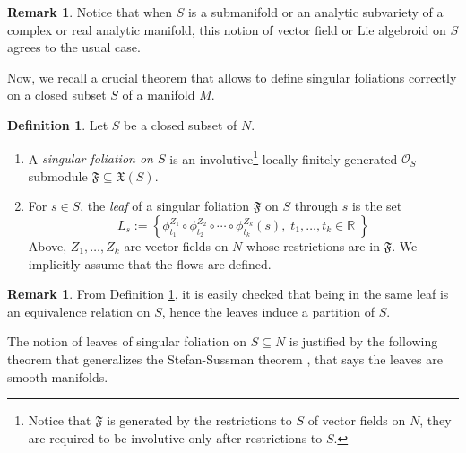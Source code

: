 \documentclass[10pt]{article}
\theoremstyle{plain}
\theoremstyle{definition}
\newtheorem{definition}[lemma]{Definition}
\newtheorem{remark}[lemma]{Remark}
\theoremstyle{remark}
\begin{document}
\begin{remark}
    Notice that when $S$ is a  submanifold or an analytic subvariety of a complex or real analytic manifold,  this notion of vector field or Lie algebroid on $S$ agrees to the usual case.
\end{remark}



Now,  we recall a crucial theorem that allows to define singular foliations correctly on a closed subset $S$ of a manifold $M$.

\begin{definition}\cite{LLL, LLS}\label{def:leaves}\label{def:SF2} Let $S$ be a closed subset of $N$.
\begin{enumerate}
    \item  A \emph{singular foliation on $S$} is an involutive\footnote{Notice that $\mathfrak{F}$ is generated by the restrictions to $S$ of vector fields on $N$, they are  required to be involutive only after restrictions to $S$.} locally finitely generated $\mathcal{O}_S$-submodule $\mathfrak{F}\subseteq\mathfrak X(S)$.
    \item For $s\in S$, the \emph{leaf} of a singular foliation $\mathfrak{F}$ on $S$ through $s$ is the set 
\begin{equation}
        L_s:=\left\{\phi_{t_1}^{Z_1}\circ \phi_{t_2}^{Z_2}\circ \cdots \circ \phi_{t_k}^{Z_k}(s),\; t_1, \ldots, t_k\in \mathbb R\; \right\}
    \end{equation}
 Above, $Z_1,\ldots,Z_k$ are vector fields on $N$  whose restrictions are in $ \mathfrak{F}$. We implicitly assume that the flows are defined.
\end{enumerate}
\end{definition}
\begin{remark}
    From  Definition \ref{def:leaves}, it is easily checked that being in the same leaf is an equivalence relation on $S$, hence the leaves induce a partition of $S$.
\end{remark}

The notion of leaves of singular foliation on $S\subseteq N$ is justified by the following theorem that generalizes the Stefan-Sussman theorem \cite{Stepan1,Stepan2}, that says the leaves are smooth manifolds. 
\end{document}
